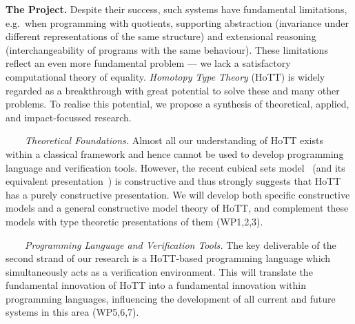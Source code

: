 \documentclass[a4paper,11pt]{article}
\newcommand{\eg}{{e.g.}\ }
\begin{document}
{\bf The Project.} Despite their success, such systems have 
fundamental limitations, \eg when programming with quotients,
supporting abstraction (invariance under different
representations of the same structure) and extensional reasoning
(interchangeability of programs with the same behaviour).
These limitations reflect an even more fundamental
problem ---  we lack a satisfactory computational theory of
equality.  {\em Homotopy Type Theory} (HoTT) is widely regarded as a
breakthrough 
with great potential to solve these and many other
problems.
To realise this potential, we propose a synthesis of theoretical, applied, and impact-focussed research.



$\;\;\; \;\;\;$ {\em Theoretical Foundations.} Almost all our
understanding of HoTT exists within a classical framework and hence
cannot be used to develop programming language and verification
tools. However, the recent cubical sets model~\cite{BezemM:cubsmt}
(and its equivalent presentation~\cite{nominal}) is constructive and
thus strongly suggests that HoTT has a purely constructive
presentation. We will develop both specific constructive models and a
general constructive model theory of HoTT, and complement these models
with type theoretic presentations of them (WP1,2,3).

$\;\;\;\;\;\;$ {\em Programming Language and Verification Tools.} The key
  deliverable of the second strand of our research is a HoTT-based
  programming language which simultaneously acts as a verification
  environment. This will translate the fundamental innovation of HoTT
  into a fundamental innovation within programming languages,
  influencing the development of all current and future systems in
  this area (WP5,6,7).
\end{document}
